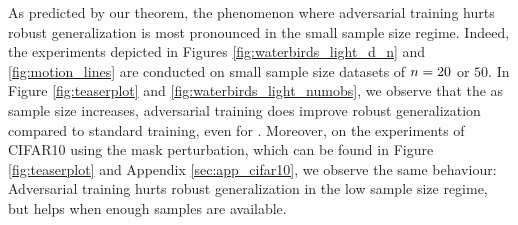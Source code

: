 

As predicted by our theorem, the phenomenon where adversarial training hurts robust generalization is most pronounced in the small sample size regime. Indeed, the experiments depicted in Figures \ref{fig:waterbirds_light_d_n} and \ref{fig:motion_lines} are conducted on small sample size datasets of $n = 20$ or $50$.
In Figure \ref{fig:teaserplot} and \ref{fig:waterbirds_light_numobs}, we
observe that the as sample size increases,  adversarial training does improve robust generalization compared to standard training, even for \nameofattacks. Moreover, on the experiments of CIFAR10 using the mask perturbation, which can be found in Figure \ref{fig:teaserplot} and Appendix \ref{sec:app_cifar10}, we observe the same behaviour: Adversarial training hurts robust generalization in the low sample size regime, but helps when enough samples are available. 



